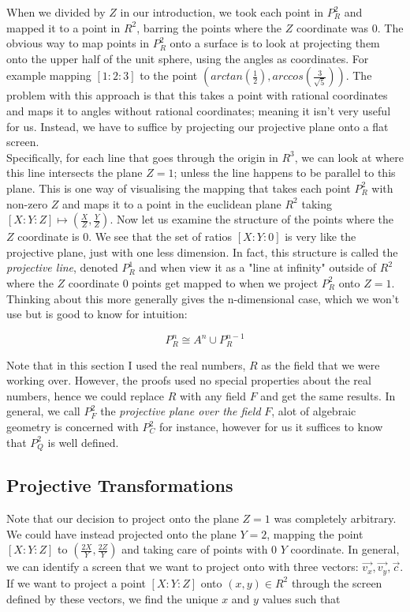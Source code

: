 \documentclass{article}
\begin{document}
When we divided by $Z$ in our introduction, we took each point in $P_R^2$ and mapped it to a point in $R^2$, barring the points where the $Z$ coordinate was $0$. The obvious way to map points in $P_R^2$ onto a surface is to look at projecting them onto the upper half of the unit sphere, using the angles as coordinates. For example mapping $[1 : 2 : 3]$ to the point $(arctan(\frac{1}{2}), arccos(\frac{3}{\sqrt{5}}))$. The problem with this approach is that this takes a point with rational coordinates and maps it to angles without rational coordinates; meaning it isn't very useful for us. Instead, we have to suffice by projecting our projective plane onto a flat screen.\\

Specifically, for each line that goes through the origin in $R^3$, we can look at where this line intersects the plane $Z = 1$; unless the line happens to be parallel to this plane. This is one way of visualising the mapping that takes each point $P_R^2$ with non-zero $Z$ and maps it to a point in the euclidean plane $R^2$ taking $[X : Y : Z] \mapsto (\frac{X}{Z}, \frac{Y}{Z})$. Now let us examine the structure of the points where the $Z$ coordinate is $0$. We see that the set of ratios $[X : Y : 0]$ is very like the projective plane, just with one less dimension. In fact, this structure is called the \emph{projective line}, denoted $P_R^1$ and when view it as a "line at infinity" outside of $R^2$ where the $Z$ coordinate $0$ points get mapped to when we project $P_R^2$ onto $Z = 1$. Thinking about this more generally gives the n-dimensional case, which we won't use but is good to know for intuition:

\[P_R^n \cong A^n \cup P_R^{n-1}\]

 Note that in this section I used the real numbers, $R$ as the field that we were working over. However, the proofs used no special properties about the real numbers, hence we could replace $R$ with any field $F$ and get the same results. In general, we call $P_F^2$ the \emph{projective plane over the field} $F$,  alot of algebraic geometry is concerned with $P_C^2$ for instance, however for us it suffices to know that $P_Q^2$ is well defined.

\subsection{Projective Transformations}

Note that our decision to project onto the plane $Z = 1$ was completely arbitrary. We could have instead projected onto the plane $Y = 2$, mapping the point $[X : Y : Z]$ to $(\frac{2X}{Y}, \frac{2Z}{Y})$ and taking care of points with 0 $Y$ coordinate. In general, we can identify a screen that we want to project onto with three vectors: $\vec{v_x}, \vec{v_y}, \vec{c}$. If we want to project a point $[X : Y : Z]$ onto $(x, y) \in R^2$ through the screen defined by these vectors, we find the unique $x$ and $y$ values such that 
\end{document}
